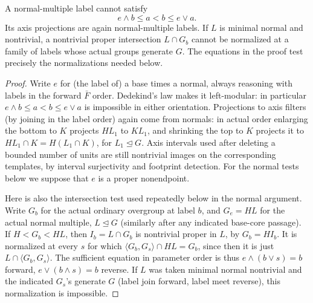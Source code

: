 \begin{lemma}\label{t:weighted-normal-test}
A normal-multiple label cannot satisfy
\[
 e\wedge b\le a<b\le e\vee a.
\]
Its axis projections are again normal-multiple labels.  If \(L\) is minimal
normal and nontrivial, a nontrivial proper intersection \(L\cap G_b\) cannot
be normalized at a family of labels whose actual groups generate \(G\).
The equations in the proof test precisely the normalizations needed below.
\end{lemma}
\begin{proof}
Write \(e\) for (the label of) a base times a normal, always reasoning with labels in the forward
\(\bar F\) order. Dedekind's law makes it left-modular: in particular \(e\wedge b\le a<b\le e\vee
a\) is impossible in either orientation. Projections to axis filters (by joining in the label
order) again come from normals: in actual order enlarging the bottom to \(K\) projects \(HL_1\) to
\(KL_1\), and shrinking the top to \(K\) projects it to \(HL_1\cap K=H(L_1\cap K)\), for
\(L_1\trianglelefteq G\). Axis intervals used after deleting a bounded number of units are still
nontrivial images on the corresponding templates, by interval surjectivity and footprint
detection. For the normal tests below we suppose that \(e\) is a proper nonendpoint.

Here is also the intersection test used repeatedly below in the normal argument. Write \(G_b\) for
the actual ordinary overgroup at label \(b\), and \(G_e=HL\) for the actual normal multiple,
\(L\trianglelefteq G\) (similarly after any indicated base-core passage). If \(H<G_b<HL\), then
\(I_b=L\cap G_b\) is nontrivial proper in \(L\), by \(G_b=H I_b\). It is normalized at every \(s\)
for which \(\langle G_b,G_s\rangle\cap HL=G_b\), since then it is just \(L\cap\langle
G_b,G_s\rangle\). The sufficient equation in parameter order is thus \(e\wedge (b\vee s)=b\)
forward, \(e\vee(b\wedge s)=b\) reverse. If \(L\) was taken minimal normal nontrivial and the
indicated \(G_s\)'s generate \(G\) (label join forward, label meet reverse), this normalization is
impossible.
\end{proof}

